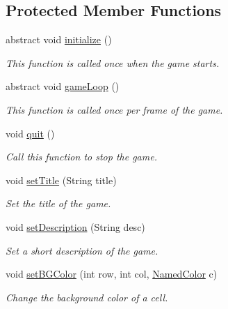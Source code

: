 \subsection*{Protected Member Functions}
\begin{DoxyCompactItemize}
\item 
abstract void \hyperlink{classbridges_1_1games_1_1_game_base_a973a52d5eee7c29b01d668fba3c61657}{initialize} ()
\begin{DoxyCompactList}\small\item\em This function is called once when the game starts. \end{DoxyCompactList}\item 
abstract void \hyperlink{classbridges_1_1games_1_1_game_base_a56d05ed744791cfc1c3792f39ff438f1}{game\+Loop} ()
\begin{DoxyCompactList}\small\item\em This function is called once per frame of the game. \end{DoxyCompactList}\item 
void \hyperlink{classbridges_1_1games_1_1_game_base_aa16a69dc83ee4e32150188e8acf1f897}{quit} ()
\begin{DoxyCompactList}\small\item\em Call this function to stop the game. \end{DoxyCompactList}\item 
void \hyperlink{classbridges_1_1games_1_1_game_base_a9f55e84af9bbf6497b314181c9d79f0a}{set\+Title} (String title)
\begin{DoxyCompactList}\small\item\em Set the title of the game. \end{DoxyCompactList}\item 
void \hyperlink{classbridges_1_1games_1_1_game_base_a3df3bee5b9d32cc9f164d06f9e9707dc}{set\+Description} (String desc)
\begin{DoxyCompactList}\small\item\em Set a short description of the game. \end{DoxyCompactList}\item 
void \hyperlink{classbridges_1_1games_1_1_game_base_a7b4d08cdb306a5bf7104ab5315acb414}{set\+B\+G\+Color} (int row, int col, \hyperlink{enumbridges_1_1base_1_1_named_color}{Named\+Color} c)
\begin{DoxyCompactList}\small\item\em Change the background color of a cell. \end{DoxyCompactList}\item 

\end{DoxyCompactItemize}
